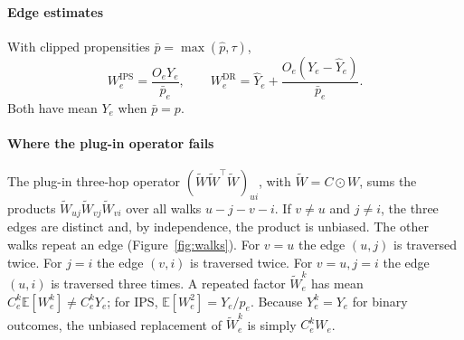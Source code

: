 \documentclass[preprint,review,12pt,authoryear]{elsarticle}
\theoremstyle{definition}
\newcommand{\E}{\mathbb{E}}
\newcommand{\tW}{\tilde W}
\begin{document}
\paragraph{Edge estimates}
With clipped propensities $\bar p=\max(\hat p,\tau)$,
\begin{equation}
W^{\mathrm{IPS}}_e=\frac{O_eY_e}{\bar p_e},\qquad
W^{\mathrm{DR}}_e=\hat Y_e+\frac{O_e(Y_e-\hat Y_e)}{\bar p_e}.
\end{equation}
Both have mean $Y_e$ when $\bar p=p$.

\paragraph{Where the plug-in operator fails}
The plug-in three-hop operator $(\tW\tW^\top\tW)_{ui}$, with $\tW=C\odot W$, sums
the products $\tW_{uj}\tW_{vj}\tW_{vi}$ over all walks $u\!-\!j\!-\!v\!-\!i$.
If $v\neq u$ and $j\neq i$, the three edges are distinct and, by independence,
the product is unbiased. The other walks repeat an edge
(Figure~\ref{fig:walks}). For $v=u$ the edge $(u,j)$ is traversed twice. For
$j=i$ the edge $(v,i)$ is traversed twice. For $v=u,j=i$ the edge $(u,i)$ is
traversed three times. A
repeated factor $\tW_e^k$ has mean $C_e^k\E[W_e^k]\ne C_e^kY_e$; for IPS,
$\E[W_e^2]=Y_e/p_e$. Because $Y_e^k=Y_e$ for binary outcomes, the unbiased
replacement of $\tW_e^k$ is simply $C_e^kW_e$.
\end{document}
